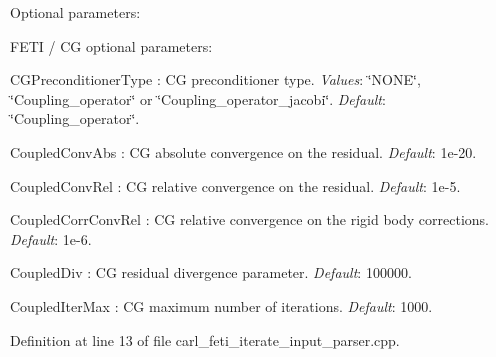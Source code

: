 Optional parameters\+:
\begin{DoxyItemize}
\item F\+E\+T\+I / C\+G optional parameters\+:
\begin{DoxyItemize}
\item {\ttfamily C\+G\+Preconditioner\+Type} \+: C\+G preconditioner type. {\itshape Values}\+: \char`\"{}\+N\+O\+N\+E\char`\"{}, \char`\"{}\+Coupling\+\_\+operator\char`\"{} or \char`\"{}\+Coupling\+\_\+operator\+\_\+jacobi\char`\"{}. {\itshape Default}\+: \char`\"{}\+Coupling\+\_\+operator\char`\"{}.
\item {\ttfamily Coupled\+Conv\+Abs} \+: C\+G absolute convergence on the residual. {\itshape Default}\+: 1e-\/20.
\item {\ttfamily Coupled\+Conv\+Rel} \+: C\+G relative convergence on the residual. {\itshape Default}\+: 1e-\/5.
\item {\ttfamily Coupled\+Corr\+Conv\+Rel} \+: C\+G relative convergence on the rigid body corrections. {\itshape Default}\+: 1e-\/6.
\item {\ttfamily Coupled\+Div} \+: C\+G residual divergence parameter. {\itshape Default}\+: 100000.
\item {\ttfamily Coupled\+Iter\+Max} \+: C\+G maximum number of iterations. {\itshape Default}\+: 1000. 
\end{DoxyItemize}
\end{DoxyItemize}

Definition at line 13 of file carl\+\_\+feti\+\_\+iterate\+\_\+input\+\_\+parser.\+cpp.


